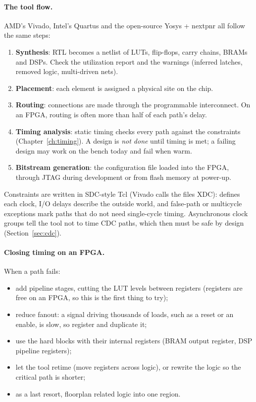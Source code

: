 \paragraph{The tool flow.} AMD's Vivado, Intel's Quartus and the open-source Yosys + nextpnr all follow the same steps:
\begin{enumerate}
  \item \textbf{Synthesis}: RTL becomes a netlist of LUTs, flip-flops, carry chains, BRAMs and DSPs. Check the utilization report and the warnings (inferred latches, removed logic, multi-driven nets).
  \item \textbf{Placement}: each element is assigned a physical site on the chip.
  \item \textbf{Routing}: connections are made through the programmable interconnect. On an FPGA, routing is often more than half of each path's delay.
  \item \textbf{Timing analysis}: static timing checks every path against the constraints (Chapter~\ref{ch:timing}). A design is \emph{not done} until timing is met; a failing design may work on the bench today and fail when warm.
  \item \textbf{Bitstream generation}: the configuration file loaded into the FPGA, through JTAG during development or from flash memory at power-up.
\end{enumerate}
Constraints are written in SDC-style Tcl (Vivado calls the files XDC):  defines each clock, I/O delays describe the outside world, and false-path or multicycle exceptions mark paths that do not need single-cycle timing. Asynchronous clock groups tell the tool not to time CDC paths, which then must be safe by design (Section~\ref{sec:cdc}).

\paragraph{Closing timing on an FPGA.} When a path fails:
\begin{itemize}
  \item add pipeline stages, cutting the LUT levels between registers (registers are free on an FPGA, so this is the first thing to try);
  \item reduce fanout: a signal driving thousands of loads, such as a reset or an enable, is slow, so register and duplicate it;
  \item use the hard blocks with their internal registers (BRAM output register, DSP pipeline registers);
  \item let the tool retime (move registers across logic), or rewrite the logic so the critical path is shorter;
  \item as a last resort, floorplan related logic into one region.
\end{itemize}

